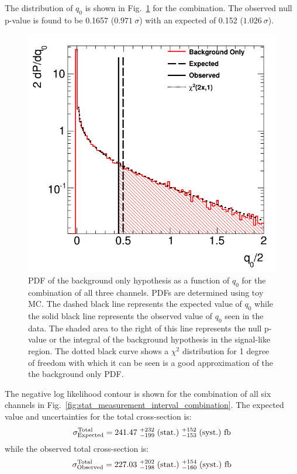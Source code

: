 The distribution of $q_0$ is shown 
in Fig.~\ref{fig:stat_measurement_significance} for the combination.  
The observed null p-value 
is found to be 0.1657 ($0.971~\sigma$) with an 
expected of 0.152 ($1.026~\sigma$).

\begin{figure}[ht!]
\centering
\includegraphics[width=0.70\columnwidth]{figures/combination/significance.png}
\caption{PDF of the background only hypothesis as a function of $q_0$ for the combination of all three channels. PDFs are determined 
using toy MC. The dashed black line represents the expected value of $q_0$ while the solid black line represents the observed value of $q_0$ seen in the data. The shaded area to the right
of this line represents the null p-value or the 
integral of the background hypothesis in the signal-like region.
The dotted black curve shows a $\chi^2$ distribution for 1 degree of freedom with which 
it can be seen is a good approximation of the 
the background only PDF.}
\label{fig:stat_measurement_significance}
\end{figure}

The negative log likelihood contour is shown
for the combination of all six channels in 
Fig.~\ref{fig:stat_measurement_interval_combination}.
The expected value and uncertainties for the total cross-section is:
\begin{equation}
\sigma^{\textrm{Total}}_{\textrm{Expected}} = 241.47 ~ ^{+232}_{-199} \mbox{$\;$(stat.)} ~^{+152}_{-153}\mbox{$\;$(syst.)} ~\textrm{fb}
\end{equation}
while the observed total cross-section is:
\begin{equation}
\sigma^{\textrm{Total}}_{\textrm{Observed}} = 227.03 ~ ^{+202}_{-198} \mbox{$\;$(stat.)} ~^{+154}_{-160} \mbox{$\;$(syst.)} ~\textrm{fb}
\end{equation}

